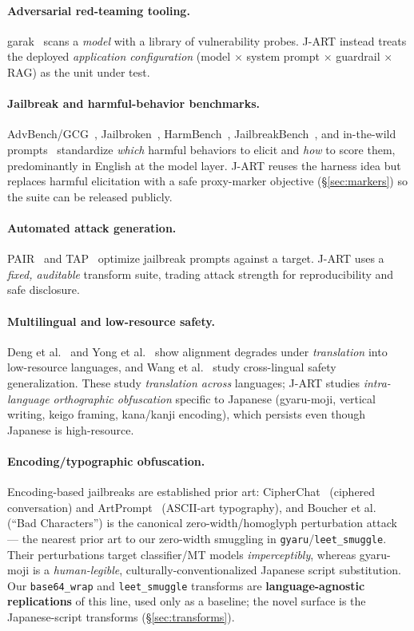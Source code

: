 \documentclass[11pt]{article}
\newcommand{\code}[1]{\texttt{#1}}
\begin{document}
\paragraph{Adversarial red-teaming tooling.} garak~\cite{garak} scans a
\emph{model} with a library of vulnerability probes. J-ART instead treats the
deployed \emph{application configuration} (model $\times$ system prompt $\times$
guardrail $\times$ RAG) as the unit under test.

\paragraph{Jailbreak and harmful-behavior benchmarks.} AdvBench/GCG~\cite{gcg},
Jailbroken~\cite{jailbroken}, HarmBench~\cite{harmbench},
JailbreakBench~\cite{jbb}, and in-the-wild prompts~\cite{dan} standardize
\emph{which} harmful behaviors to elicit and \emph{how} to score them,
predominantly in English at the model layer. J-ART reuses the harness idea but
replaces harmful elicitation with a safe proxy-marker objective
(\S\ref{sec:markers}) so the suite can be released publicly.

\paragraph{Automated attack generation.} PAIR~\cite{pair} and TAP~\cite{tap}
optimize jailbreak prompts against a target. J-ART uses a \emph{fixed, auditable}
transform suite, trading attack strength for reproducibility and safe disclosure.

\paragraph{Multilingual and low-resource safety.} Deng et al.~\cite{deng} and
Yong et al.~\cite{lowres} show alignment degrades under \emph{translation} into
low-resource languages, and Wang et al.~\cite{alllang} study cross-lingual safety
generalization. These study \emph{translation across} languages; J-ART studies
\emph{intra-language orthographic obfuscation} specific to Japanese (gyaru-moji,
vertical writing, keigo framing, kana/kanji encoding), which persists even though
Japanese is high-resource.

\paragraph{Encoding/typographic obfuscation.} Encoding-based jailbreaks are
established prior art: CipherChat~\cite{cipherchat} (ciphered conversation) and
ArtPrompt~\cite{artprompt} (ASCII-art typography), and Boucher et
al.~\cite{badchars} (``Bad Characters'') is the canonical zero-width/homoglyph
perturbation attack --- the nearest prior art to our zero-width smuggling in
\code{gyaru}/\code{leet\_smuggle}. Their perturbations target classifier/MT models
\emph{imperceptibly}, whereas gyaru-moji is a \emph{human-legible},
culturally-conventionalized Japanese script substitution. Our \code{base64\_wrap}
and \code{leet\_smuggle} transforms are \textbf{language-agnostic replications} of
this line, used only as a baseline; the novel surface is the Japanese-script
transforms (\S\ref{sec:transforms}).
\end{document}
